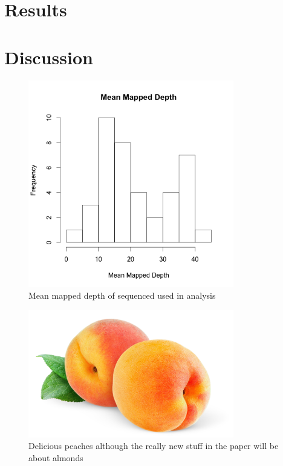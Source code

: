 \documentclass[12pt]{article}
\begin{document}




\section*{Results}


\section*{Discussion}

\pagebreak

%
\pagebreak
\begin{figure}[b]
\centering
   \includegraphics[width=0.8\textwidth]{depthBQ20MQ30.png}
  \caption{Mean mapped depth of sequenced used in analysis}
  \label{fig:depth}
\end{figure}

\begin{figure}[b]
\centering
   \includegraphics[width=0.8\textwidth]{peachzdfgad.jpg}
  \caption{Delicious peaches although the really new stuff in the paper will be about almonds}
  \label{fig:peach}
\end{figure}
%
\pagebreak
\end{document}
